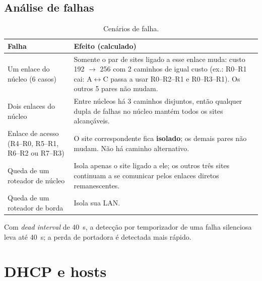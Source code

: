 \documentclass[12pt,a4paper]{article}
\begin{document}
\subsection{Análise de falhas}
\begin{table}[H]\centering\small
\begin{tabular}{@{}p{4.3cm}p{9.5cm}@{}}\toprule
Falha & Efeito (calculado)\\\midrule
Um enlace do núcleo (6 casos) & Somente o par de sites ligado a esse enlace muda: custo 192 $\to$ 256 com 2 caminhos de igual custo (ex.: R0--R1 cai: A$\leftrightarrow$C passa a usar R0--R2--R1 e R0--R3--R1). Os outros 5 pares não mudam.\\
Dois enlaces do núcleo & Entre núcleos há 3 caminhos disjuntos, então qualquer dupla de falhas no núcleo mantém todos os sites alcançáveis.\\
Enlace de acesso (R4--R0, R5--R1, R6--R2 ou R7--R3) & O site correspondente fica \textbf{isolado}; os demais pares não mudam. Não há caminho alternativo.\\
Queda de um roteador de núcleo & Isola apenas o site ligado a ele; os outros três sites continuam a se comunicar pelos enlaces diretos remanescentes.\\
Queda de um roteador de borda & Isola sua LAN.\\\bottomrule
\end{tabular}
\caption{Cenários de falha.}
\end{table}
Com \textit{dead interval} de 40~s, a detecção por temporizador de uma falha silenciosa leva até 40~s; a perda de portadora é detectada mais rápido.

\section{DHCP e hosts}\label{sec:dhcp}
\end{document}
